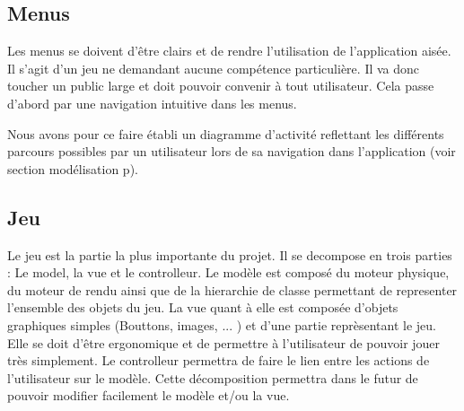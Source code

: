 \subsection{Menus}
		
	Les menus se doivent d'être clairs et de rendre l'utilisation de
	l'application aisée. Il s'agit d'un jeu ne demandant aucune compétence
	particulière. Il va donc toucher un public large et doit pouvoir convenir à
	tout utilisateur. Cela passe d'abord par une navigation intuitive dans les
	menus.
	
	Nous avons pour ce faire établi un diagramme d'activité reflettant les
	différents parcours possibles par un utilisateur lors de sa navigation dans
	l'application (voir section modélisation p\pageref{activité}).
		
\subsection{Jeu}
		
	Le jeu est la partie la plus importante du projet. 
	Il se decompose en trois parties : Le model, la vue et le controlleur. 
	Le modèle est composé du moteur physique, du moteur de rendu ainsi que de la
	hierarchie de classe permettant de representer l'ensemble des objets du jeu. 
	La vue quant à elle est composée d'objets graphiques simples (Bouttons, images, ... ) 
	et d'une partie reprèsentant le jeu. Elle se doit d'être ergonomique et de permettre
	à l'utilisateur de pouvoir jouer très simplement. Le controlleur permettra de faire 
	le lien entre les actions de l'utilisateur sur le modèle. Cette décomposition permettra dans 
	le futur de pouvoir modifier facilement le modèle et/ou la vue.
		
